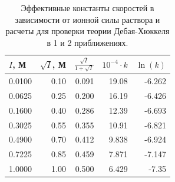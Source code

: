 \documentclass[a4paper,12pt]{article}
\begin{document}
\begin{table}[h!]
\centering
\begin{tabular}{|r|r|r|r|r|}
\hline
\multicolumn{1}{|l|}{$I$, М} & \multicolumn{1}{l|}{$\sqrt{I}$, М} & \multicolumn{1}{l|}{$ \frac{\sqrt{I}}{1+\sqrt{I}}$} & \multicolumn{1}{l|}{$10^{-4} \cdot k$} & \multicolumn{1}{l|}{$\ln (k) $} \\ \hline
0.0100                       & 0.10                               & 0.091                                               & 19.08                                   & -6.262                          \\ \hline
0.0625                       & 0.25                               & 0.200                                               & 16.19                                   & -6.426                          \\ \hline
0.1600                       & 0.40                               & 0.286                                               & 12.39                                   & -6.693                          \\ \hline
0.3025                       & 0.55                               & 0.355                                               & 10.91                                   & -6.821                          \\ \hline
0.4900                       & 0.70                               & 0.412                                               & 9.838                                   & -6.924                          \\ \hline
0.7225                       & 0.85                               & 0.459                                               & 7.871                                   & -7.147                          \\ \hline
1.0000                       & 1.00                               & 0.500                                               & 6.429                                   & -7.35                           \\ \hline
\end{tabular}
\caption{Эффективные константы скоростей в зависимости от ионной силы раствора и расчеты для проверки теории Дебая-Хюккеля в 1 и 2 приближениях.}
\label{tab:my-table}
\end{table}
\end{document}
